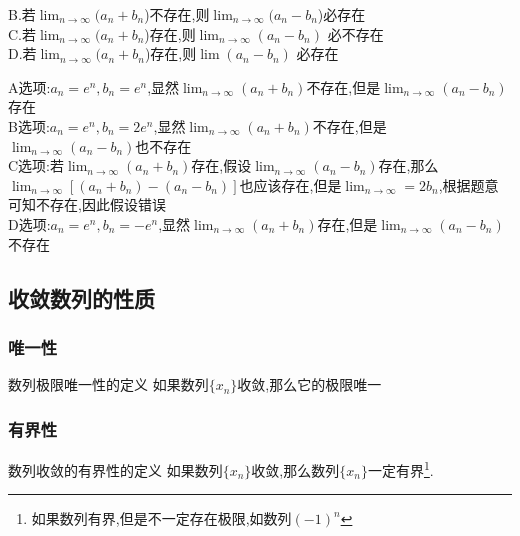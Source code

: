 \documentclass[8pt a4paper, oneside, UTF8]{ctexbook}
\begin{document}
\begin{sloppypar}
\begin{problem}
        B.若$\lim_{n \to \infty}(a_n+b_n$)不存在,则$\lim_{n \to \infty}(a_n-b_n$)必存在\\
        C.若$\lim_{n \to \infty}(a_n+b_n$)存在,则$\lim_{n \to \infty}(a_n-b_n)$ 必不存在 \\ 
        D.若$\lim_{n \to \infty}(a_n+b_n$)存在,则$\lim(a_n-b_n)$ 必存在
    \end{problem}
    \begin{solution}
        A选项:$a_n=e^n,b_n=e^n$,显然$\lim_{n \to \infty}(a_n+b_n)$不存在,但是$\lim_{n \to \infty}(a_n-b_n)$存在\\
        B选项:$a_n=e^n,b_n=2e^{n}$,显然$\lim_{n \to \infty}(a_n+b_n)$不存在,但是$\lim_{n \to \infty}(a_n-b_n)$也不存在\\
        C选项:若$\lim_{n \to \infty}(a_n+b_n)$存在,假设$\lim_{ n \to \infty}(a_n-b_n)$存在,那么$\lim_{n\to \infty}[(a_n+b_n)-(a_n-b_n)]$也应该存在,但是$\lim_{n \to \infty}=2 b_n$,根据题意可知不存在,因此假设错误\\
        D选项:$a_n=e^n,b_n=-e^n$,显然$\lim_{n \to \infty}(a_n+b_n)$存在,但是$\lim_{n \to \infty}(a_n-b_n)$不存在
    \end{solution}

    \subsection{收敛数列的性质}
    \subsubsection{唯一性}
    \begin{defn}{数列极限唯一性的定义}{}
        如果数列$\{ x_n \}$收敛,那么它的极限唯一
    \end{defn}
    \subsubsection{有界性}
    \begin{defn}{数列收敛的有界性的定义}{}
        如果数列$\{x_n\}$收敛,那么数列$\{x_n\}$一定有界\footnote{如果数列有界,但是不一定存在极限,如数列$(-1)^n$}.
    \end{defn}

\end{sloppypar}
\end{document}
